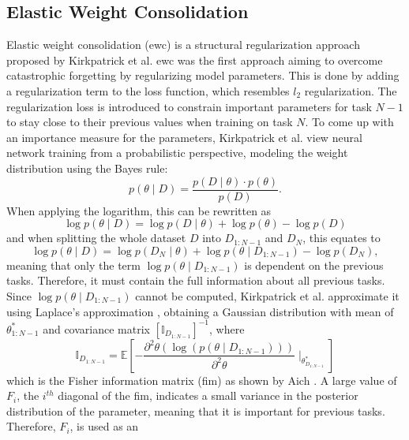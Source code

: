 \subsection{Elastic Weight Consolidation}
\label{sec:Related_work:Continual_Learning:EWC}
Elastic weight consolidation (\gls{ewc}) \cite{kirkpatrick2017overcoming} is a structural regularization approach proposed by Kirkpatrick et al.
\gls{ewc} was the first approach aiming to overcome catastrophic forgetting by regularizing model parameters. This is done by adding a regularization
term to the loss function, which resembles $l_2$ regularization. The regularization loss is introduced to constrain important parameters for
task $N-1$ to stay close to their previous values when training on task $N$. To come up with an importance measure for the parameters,
Kirkpatrick et al. view neural network training from a probabilistic perspective, modeling the weight distribution using the Bayes rule:
\begin{equation}
    p(\theta \mid D) = \frac{p(D \mid \theta) \cdot p(\theta)}{p(D)}.
\end{equation}
When applying the logarithm, this can be rewritten as
\begin{equation}
    \log p(\theta \mid D) = \log p(D \mid \theta) + \log p(\theta) - \log p(D)
\end{equation}
and when splitting the whole dataset $D$ into $D_{1:N-1}$ and $D_N$, this equates to
\begin{equation}
    \log p(\theta \mid D) = \log p(D_N \mid \theta) + \log p(\theta \mid D_{1:N-1}) - \log p(D_N),
\end{equation}
meaning that only the term $\log p(\theta \mid D_{1:N-1})$ is dependent on the previous tasks. Therefore, it must contain the full information 
about all previous tasks. Since $\log p(\theta \mid D_{1:N-1})$ cannot be computed, Kirkpatrick et al. approximate it using Laplace's approximation
\cite{mackay2003information}, obtaining a Gaussian distribution with mean of $\theta^*_{1:N-1}$ and covariance matrix $[\mathbb{I}_{D_{1:N-1}}]^{-1}$,
where
\begin{equation}
    \mathbb{I}_{D_{1:N-1}} = \mathbb{E} [- \frac{\partial^2 \theta (\log (p(\theta \mid D_{1:N-1})))}{\partial^2 \theta} \mid_{\theta^*_{D_{1:N-1}}}]
\end{equation} 
which is the Fisher information matrix (\gls{fim}) as shown by Aich \cite{aich2021elastic}. A large value of $F_i$, the $i^{th}$ diagonal of the \gls{fim},
indicates a small variance in the posterior distribution of the parameter, meaning that it is important for previous tasks. Therefore, $F_i$, is used as an
